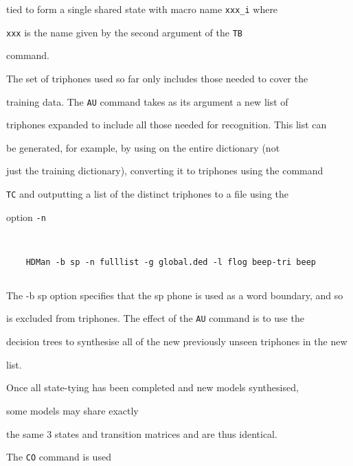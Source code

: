 tied to form a single shared state with macro name \texttt{xxx\_i} where


\texttt{xxx} is the name given by the second argument of the \texttt{TB}


command.





The set of triphones used so far only includes those needed to cover the


training data. The \texttt{AU} command takes as its argument a new list of


triphones expanded to include all those needed for recognition.  This list can


be generated, for example, by using  on the entire dictionary (not


just the training dictionary), converting it to triphones using the command


\texttt{TC} and outputting a list of the distinct triphones to a file using the


option \texttt{-n} 





\begin{verbatim}


    HDMan -b sp -n fulllist -g global.ded -l flog beep-tri beep


\end{verbatim}





\noindent


The -b sp option specifies that the sp phone is used as a word boundary, and so 


is excluded from triphones.  The effect of the \texttt{AU} command is to use the 


decision trees to synthesise all of the new previously unseen triphones in the new 


list.







Once all state-tying has been completed and new models synthesised, 


some models may  share exactly


the same 3 states and transition matrices and are thus identical.


The \texttt{CO} command is used


